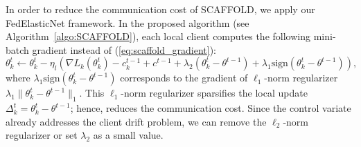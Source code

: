 \documentclass{article} %
\begin{document}
In order to reduce the communication cost of SCAFFOLD, we apply our FedElasticNet framework. In the proposed algorithm (see Algorithm~\ref{algo:SCAFFOLD}), each local client computes the following mini-batch gradient instead of (\ref{eq:scaffold_gradient}): 
\begin{equation}
 \theta_{k}^{t} \gets \theta_k^{t} - \eta_{l}\left ( \nabla L_{k}\left ( \theta_{k}^{t} \right ) - c_{k}^{t-1} +c^{t-1} + \lambda_2 (\theta_k^t - \theta^{t-1}) + \lambda_1 \text{sign}(\theta_k^t - \theta^{t-1}) \right),
\end{equation}
where $\lambda_1 \text{sign}(\theta_k^t - \theta^{t-1})$ corresponds to the gradient of $\ell_1$-norm regularizer $\lambda_1 \| \theta_k^t - \theta^{t-1} \|_1$. This $\ell_1$-norm regularizer sparsifies the local update $\Delta_k^t = \theta_{k}^{t} - \theta^{t-1}$; hence, reduces the communication cost. Since the control variate already addresses the client drift problem, we can remove the $\ell_2$-norm regularizer or set $\lambda_2$ as a small value.  
\end{document}
